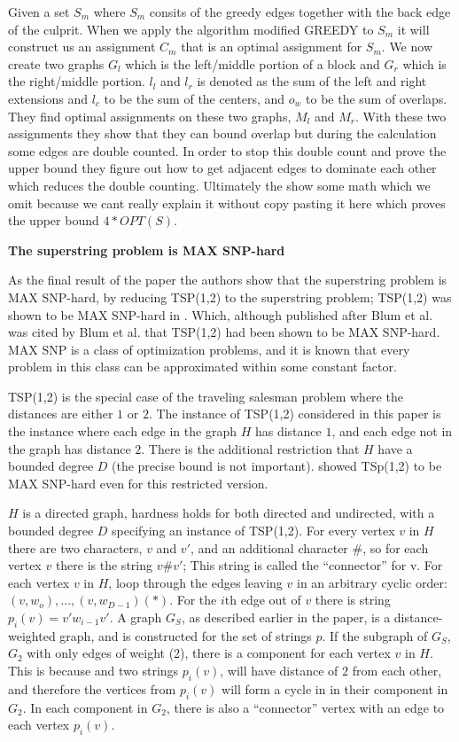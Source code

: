 \documentclass[letterpaper,11pt,titlepage]{article}
\begin{document}
Given a set $S_m$ where $S_m$ consits of the greedy edges together with the back edge of the culprit. When we apply the algorithm modified GREEDY to $S_m$ it will construct us an assignment $C_m$ that is an optimal assignment for $S_m$. We now create two graphs $G_l$ which is the left/middle portion of a block and $G_r$ which is the right/middle portion. $l_l$ and $l_r$ is denoted as the sum of the left and right extensions and $l_c$ to be the sum of the centers, and $o_w$ to be the sum of overlaps. They find optimal assignments on these two graphs, $M_l$ and $M_r$. With these two assignments they show that they can bound overlap but during the calculation some edges are double counted. In order to stop this double count and prove the upper bound they figure out how to get adjacent edges to dominate each other which reduces the double counting. Ultimately the show some math which we omit because we cant really explain it without copy pasting it here which proves the upper bound $4 * OPT(S)$.

\textbf{The superstring problem is MAX SNP-hard}

As the final result of the paper the authors show that the superstring problem is MAX SNP-hard, by reducing TSP(1,2) to the superstring problem; TSP(1,2) was shown to be MAX SNP-hard in \cite{papadimitriou1993}.  Which, although published after Blum et al. was cited by Blum et al. that TSP(1,2) had been shown to be MAX SNP-hard.  MAX SNP is a class of optimization problems, and it is known that every problem in this class can be approximated within some constant factor. 

TSP(1,2) is the special case of the traveling salesman problem where the distances are either $1$ or $2$.  The instance of TSP(1,2) considered in this paper is the instance where each edge in the graph $H$ has distance $1$, and each edge not in the graph has distance $2$.  There is the additional restriction that $H$ have a bounded degree $D$ (the precise bound is not important).  \cite{papadimitriou1993} showed TSp(1,2) to be MAX SNP-hard even for this restricted version.  


$H$ is a directed graph, hardness holds for both directed and undirected, with a bounded degree $D$ specifying an instance of TSP(1,2).  For every vertex $v$ in $H$ there are two characters, $v$ and $v'$, and an additional character $\#$, so for each vertex $v$ there is the string $v\#v'$; This string is called the ``connector'' for v.  For each vertex $v$ in $H$, loop through the edges leaving $v$ in an arbitrary cyclic order: $(v, w_o),...,(v,w_{D-1})(*)$.  For the $i$th edge out of $v$ there is string $p_i(v) = v'w_{i-1}v'$.  A graph $G_S$, as described earlier in the paper, is a distance-weighted graph, and is constructed for the set of strings $p$.  If the subgraph of $G_S$, $G_2$ with only edges of weight (2), there is a component for each vertex $v$ in $H$.  This is because and two strings $p_i(v)$, will have distance of $2$ from each other, and therefore the vertices from $p_i(v)$ will form a cycle in in their component in $G_2$.  In each component in $G_2$, there is also a ``connector'' vertex with an edge to each vertex $p_i(v)$.  
\end{document}
